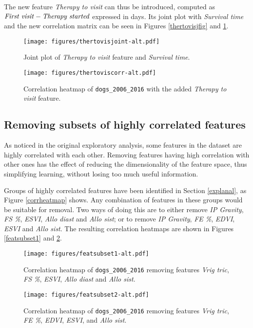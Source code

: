 \documentclass[12pt]{report}
\begin{document}
The new feature \textit{Therapy to visit} can thus be introduced, computed as $ \text{\emph{First visit}} - \text{\emph{Therapy started}} $ expressed in days. Its joint plot with \textit{Survival time} and the new correlation matrix can be seen in Figures \ref{thertovisjfig} and \ref{thertoviscfig}.

\begin{figure}[hp]
  \centering
  \vspace*{-1cm}
  	\texttt{[image: figures/thertovisjoint-alt.pdf]}
  \caption{Joint plot of \textit{Therapy to visit} feature and \textit{Survival time}.}
  \label{thertovisjfig}
  \vspace{0.5cm}
  \centering
  	\texttt{[image: figures/thertoviscorr-alt.pdf]}
  \vspace{-0.2cm}
  \caption{Correlation heatmap of \texttt{dogs\_2006\_2016} with the added \textit{Therapy to visit} feature.}
  \label{thertoviscfig}
\end{figure}

\subsection*{Removing subsets of highly correlated features}
As noticed in the original exploratory analysis, some features in the dataset are highly correlated with each other. Removing features having high correlation with other ones has the effect of reducing the dimensionality of the feature space, thus simplifying learning, without losing too much useful information.

Groups of highly correlated features have been identified in Section \ref{explanal}, as Figure \ref{corrheatmap} shows. Any combination of features in these groups would be suitable for removal. Two ways of doing this are to either remove \textit{IP Gravity}, \textit{FS \%}, \textit{ESVI}, \textit{Allo diast} and \textit{Allo sist}; or to remove \textit{IP Gravity}, \textit{FE \%}, \textit{EDVI}, \textit{ESVI} and \textit{Allo sist}. The resulting correlation heatmaps are shown in Figures \ref{featsubset1} and \ref{featsubset2}.

\begin{figure}[hp]
  \centering
  \vspace*{-0.8cm}
  	\texttt{[image: figures/featsubset1-alt.pdf]}
  \vspace{-0.2cm}
  \caption{Correlation heatmap of \texttt{dogs\_2006\_2016} removing features \textit{Vrig tric}, \textit{FS \%}, \textit{ESVI}, \textit{Allo diast} and \textit{Allo sist}.}
  \label{featsubset1}
  \vspace{0.1cm}
  \centering
  	\texttt{[image: figures/featsubset2-alt.pdf]}
  \vspace{-0.2cm}
  \caption{Correlation heatmap of \texttt{dogs\_2006\_2016} removing features \textit{Vrig tric}, \textit{FE \%}, \textit{EDVI}, \textit{ESVI}, and \textit{Allo sist}.}
  \label{featsubset2}
\end{figure}
\end{document}
